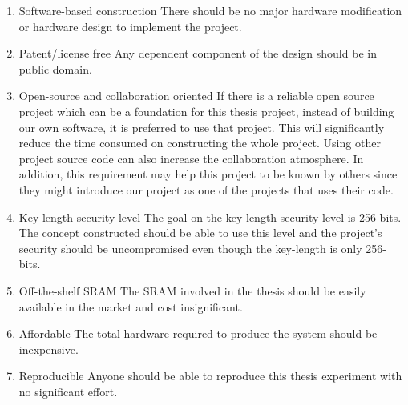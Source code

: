 \begin{enumerate}
    \item Software-based construction\newline
    There should be no major hardware modification or hardware design to implement the project.
    \item Patent/license free\newline
    Any dependent component of the design should be in public domain.
    \item Open-source and collaboration oriented\newline
    If there is a reliable open source project which can be a foundation for this thesis project, instead of building our own software, it is preferred to use that project. This will significantly reduce the time consumed on constructing the whole project. Using other project source code can also increase the collaboration atmosphere. In addition, this requirement may help this project to be known by others since they might introduce our project as one of the projects that uses their code.
    \item Key-length security level\newline
    The goal on the key-length security level is 256-bits. The concept constructed should be able to use this level and the project's security should be uncompromised even though the key-length is only 256-bits.
    \item Off-the-shelf SRAM\newline
    The SRAM involved in the thesis should be easily available in the market and cost insignificant.
    \item Affordable\newline
    The total hardware required to produce the system should be inexpensive.
    \item Reproducible\newline
    Anyone should be able to reproduce this thesis experiment with no significant effort.
\end{enumerate}

